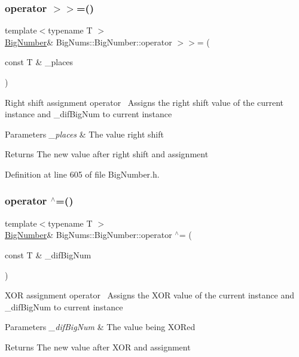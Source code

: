 \subsubsection{\texorpdfstring{operator $>$$>$=()}{operator >>=()}}
{\footnotesize\ttfamily template$<$typename T $>$ \\
\mbox{\hyperlink{class_big_nums_1_1_big_number}{Big\+Number}}\& Big\+Nums\+::\+Big\+Number\+::operator $>$$>$= (\begin{DoxyParamCaption}\item[{const T \&}]{\+\_\+places }\end{DoxyParamCaption})\hspace{0.3cm}{\ttfamily [inline]}}

Right shift assignment operator~\newline
Assigns the right shift value of the current instance and \+\_\+dif\+Big\+Num to current instance 
\begin{DoxyParams}{Parameters}
{\em \+\_\+places} & The value right shift \\
\hline
\end{DoxyParams}
\begin{DoxyReturn}{Returns}
The new value after right shift and assignment 
\end{DoxyReturn}


Definition at line 605 of file Big\+Number.\+h.

\mbox{\label{class_big_nums_1_1_big_number_a76fe5402cd5bcd53c850ce31704b5b57}} 
\subsubsection{\texorpdfstring{operator $^\wedge$=()}{operator ^=()}}
{\footnotesize\ttfamily template$<$typename T $>$ \\
\mbox{\hyperlink{class_big_nums_1_1_big_number}{Big\+Number}}\& Big\+Nums\+::\+Big\+Number\+::operator $^\wedge$= (\begin{DoxyParamCaption}\item[{const T \&}]{\+\_\+dif\+Big\+Num }\end{DoxyParamCaption})\hspace{0.3cm}{\ttfamily [inline]}}

X\+OR assignment operator~\newline
 Assigns the X\+OR value of the current instance and \+\_\+dif\+Big\+Num to current instance 
\begin{DoxyParams}{Parameters}
{\em \+\_\+dif\+Big\+Num} & The value being X\+O\+Red \\
\hline
\end{DoxyParams}
\begin{DoxyReturn}{Returns}
The new value after X\+OR and assignment 
\end{DoxyReturn}


